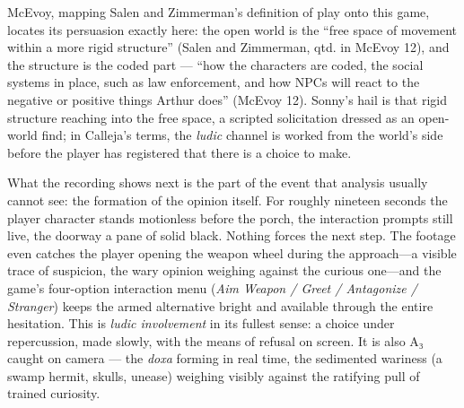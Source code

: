 McEvoy, mapping Salen and Zimmerman's definition of play onto this game, locates its persuasion exactly here: the open world is the ``free space of movement within a more rigid structure'' (Salen and Zimmerman, qtd. in McEvoy 12), and the structure is the coded part — ``how the characters are coded, the social systems in place, such as law enforcement, and how NPCs will react to the negative or positive things Arthur does'' (McEvoy 12). Sonny's hail is that rigid structure reaching into the free space, a scripted solicitation dressed as an open-world find; in Calleja's terms, the \textit{ludic} channel is worked from the world's side before the player has registered that there is a choice to make.

What the recording shows next is the part of the event that analysis usually cannot see: the formation of the opinion itself. For roughly nineteen seconds the player character stands motionless before the porch, the interaction prompts still live, the doorway a pane of solid black. Nothing forces the next step. The footage even catches the player opening the weapon wheel during the approach---a visible trace of suspicion, the wary opinion weighing against the curious one---and the game's four-option interaction menu (\textit{Aim Weapon / Greet / Antagonize / Stranger}) keeps the armed alternative bright and available through the entire hesitation. This is \textit{ludic involvement} in its fullest sense: a choice under repercussion, made slowly, with the means of refusal on screen. It is also A₃ caught on camera --- the \textit{doxa} forming in real time, the sedimented wariness (a swamp hermit, skulls, unease) weighing visibly against the ratifying pull of trained curiosity.
